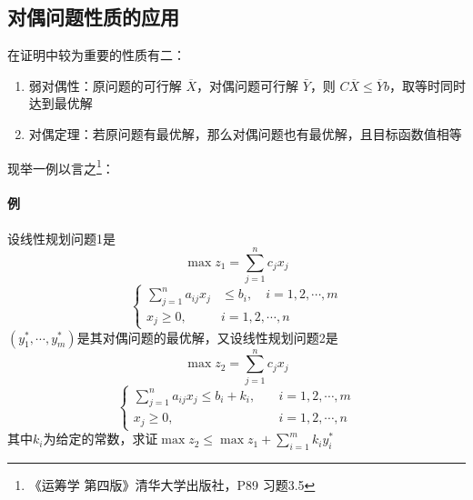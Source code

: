 \documentclass[]{report}
\begin{document}
		\subsection{对偶问题性质的应用}
		在证明中较为重要的性质有二：
		\begin{enumerate}
			\item 弱对偶性：原问题的可行解 $\overline{X}$，对偶问题可行解 $\bar{Y}$，则 $C\overline{X}\leq\overline{Y}b$，取等时同时达到最优解
			\item 对偶定理：若原问题有最优解，那么对偶问题也有最优解，且目标函数值相等
		\end{enumerate}
		现举一例以言之\footnote{《运筹学 第四版》清华大学出版社，P89 习题3.5}：\par
		\paragraph{例}
		设线性规划问题1是
		$$\max z_1=\sum_{j=1}^nc_jx_j$$
		$$\begin{cases}
			\sum_{j=1}^na_{ij}x_j&\le b_i,\quad i=1,2,\cdots,m\\
			x_j\ge0,\quad &i=1,2,\cdots,n
		\end{cases}$$
		$(y_1^*,\cdots,y_m^*)$是其对偶问题的最优解，又设线性规划问题2是
		$$\max z_2=\sum_{j=1}^nc_jx_j$$
		$$\begin{cases}
			\sum_{j=1}^na_{ij}x_j\le b_i+k_i,\quad &i=1,2,\cdots,m\\
			x_j\ge0,&i=1,2,\cdots,n
		\end{cases}$$
		其中$k_i$为给定的常数，求证$\displaystyle\max z_2\le\max z_1+\sum_{i=1}^mk_iy_i^*$\par
\end{document}

